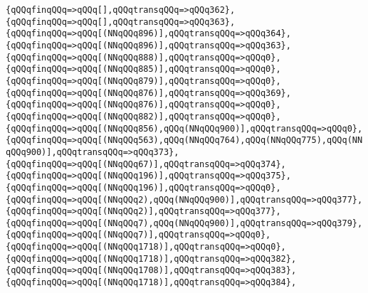 \verb|{qQQqfinqQQq=>qQQq[],qQQqtransqQQq=>qQQq362},|\newline
\verb|{qQQqfinqQQq=>qQQq[],qQQqtransqQQq=>qQQq363},|\newline
\verb|{qQQqfinqQQq=>qQQq[(NNqQQq896)],qQQqtransqQQq=>qQQq364},|\newline
\verb|{qQQqfinqQQq=>qQQq[(NNqQQq896)],qQQqtransqQQq=>qQQq363},|\newline
\verb|{qQQqfinqQQq=>qQQq[(NNqQQq888)],qQQqtransqQQq=>qQQq0},|\newline
\verb|{qQQqfinqQQq=>qQQq[(NNqQQq885)],qQQqtransqQQq=>qQQq0},|\newline
\verb|{qQQqfinqQQq=>qQQq[(NNqQQq879)],qQQqtransqQQq=>qQQq0},|\newline
\verb|{qQQqfinqQQq=>qQQq[(NNqQQq876)],qQQqtransqQQq=>qQQq369},|\newline
\verb|{qQQqfinqQQq=>qQQq[(NNqQQq876)],qQQqtransqQQq=>qQQq0},|\newline
\verb|{qQQqfinqQQq=>qQQq[(NNqQQq882)],qQQqtransqQQq=>qQQq0},|\newline
\verb|{qQQqfinqQQq=>qQQq[(NNqQQq856),qQQq(NNqQQq900)],qQQqtransqQQq=>qQQq0},|\newline
\verb|{qQQqfinqQQq=>qQQq[(NNqQQq563),qQQq(NNqQQq764),qQQq(NNqQQq775),qQQq(NNqQQq900)],qQQqtransqQQq=>qQQq373},|\newline
\verb|{qQQqfinqQQq=>qQQq[(NNqQQq67)],qQQqtransqQQq=>qQQq374},|\newline
\verb|{qQQqfinqQQq=>qQQq[(NNqQQq196)],qQQqtransqQQq=>qQQq375},|\newline
\verb|{qQQqfinqQQq=>qQQq[(NNqQQq196)],qQQqtransqQQq=>qQQq0},|\newline
\verb|{qQQqfinqQQq=>qQQq[(NNqQQq2),qQQq(NNqQQq900)],qQQqtransqQQq=>qQQq377},|\newline
\verb|{qQQqfinqQQq=>qQQq[(NNqQQq2)],qQQqtransqQQq=>qQQq377},|\newline
\verb|{qQQqfinqQQq=>qQQq[(NNqQQq7),qQQq(NNqQQq900)],qQQqtransqQQq=>qQQq379},|\newline
\verb|{qQQqfinqQQq=>qQQq[(NNqQQq7)],qQQqtransqQQq=>qQQq0},|\newline
\verb|{qQQqfinqQQq=>qQQq[(NNqQQq1718)],qQQqtransqQQq=>qQQq0},|\newline
\verb|{qQQqfinqQQq=>qQQq[(NNqQQq1718)],qQQqtransqQQq=>qQQq382},|\newline
\verb|{qQQqfinqQQq=>qQQq[(NNqQQq1708)],qQQqtransqQQq=>qQQq383},|\newline
\verb|{qQQqfinqQQq=>qQQq[(NNqQQq1718)],qQQqtransqQQq=>qQQq384},|\newline
